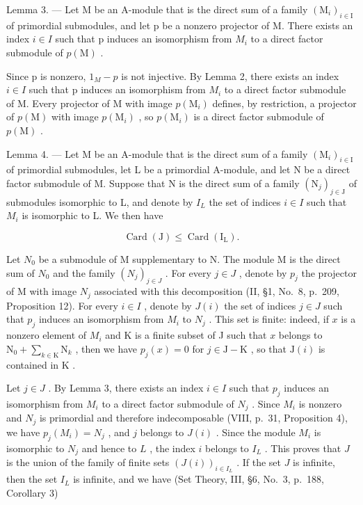 Lemma 3. --- Let M be an A-module that is the direct sum of a family \((\mathrm{M}_{i})_{i\in\mathrm{I}}\) of primordial submodules, and let p be a nonzero projector of M. There exists an index \(i\in I\) such that p induces an isomorphism from \(M_{i}\) to a direct factor submodule of \(p(\mathrm{M})\) .

Since p is nonzero, \(1_{M} - p\) is not injective. By Lemma 2, there exists an index \(i \in I\) such that p induces an isomorphism from \(M_{i}\) to a direct factor submodule of M. Every projector of M with image \(p(\mathrm{M}_{i})\) defines, by restriction, a projector of \(p(\mathrm{M})\) with image \(p(\mathrm{M}_{i})\) , so \(p(\mathrm{M}_{i})\) is a direct factor submodule of \(p(\mathrm{M})\) .

Lemma 4. --- Let M be an A-module that is the direct sum of a family \((\mathrm{M}_{i})_{i\in\mathrm{I}}\) of primordial submodules, let L be a primordial A-module, and let N be a direct factor submodule of M. Suppose that N is the direct sum of a family \((\mathrm{N}_{j})_{j\in\mathrm{J}}\) of submodules isomorphic to L, and denote by \(I_{L}\) the set of indices \(i\in I\) such that \(M_{i}\) is isomorphic to L. We then have

\[
\operatorname{Card} (\mathrm{J}) \leqslant \operatorname{Card} \left(\mathrm{I} _ {\mathrm{L}}\right).\tag{1}
\]

Let \(N_0\) be a submodule of M supplementary to N. The module M is the direct sum of \(N_0\) and the family \((N_j)_{j \in J}\) . For every \(j \in J\) , denote by \(p_j\) the projector of M with image \(N_j\) associated with this decomposition (II, §1, No.~8, p.~209, Proposition 12). For every \(i \in I\) , denote by \(J(i)\) the set of indices \(j \in J\) such that \(p_j\) induces an isomorphism from \(M_i\) to \(N_j\) . This set is finite: indeed, if \(x\) is a nonzero element of \(M_i\) and K is a finite subset of J such that \(x\) belongs to \(\mathrm{N}_0 + \sum_{k\in \mathrm{K}}\mathrm{N}_k\) , then we have \(p_j(x) = 0\) for \(j\in \mathrm{J} - \mathrm{K}\) , so that \(\mathrm{J}(i)\) is contained in \(\mathrm{K}\) .

Let \(j \in J\) . By Lemma 3, there exists an index \(i \in I\) such that \(p_j\) induces an isomorphism from \(M_i\) to a direct factor submodule of \(N_j\) . Since \(M_i\) is nonzero and \(N_j\) is primordial and therefore indecomposable (VIII, p.~31, Proposition 4), we have \(p_j(M_i) = N_j\) , and \(j\) belongs to \(J(i)\) . Since the module \(M_i\) is isomorphic to \(N_j\) and hence to \(L\) , the index \(i\) belongs to \(I_L\) . This proves that \(J\) is the union of the family of finite sets \((J(i))_{i \in I_L}\) . If the set \(J\) is infinite, then the set \(I_L\) is infinite, and we have (Set Theory, III, §6, No.~3, p.~188, Corollary 3)

